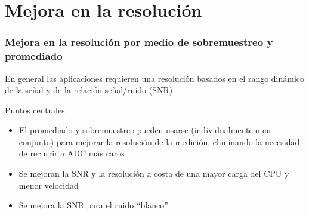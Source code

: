 \documentclass{beamer}
\begin{document}
\section{Mejora en la resolución}

\begin{frame}
\frametitle{Mejora en la resolución por medio de sobremuestreo y promediado}
\begin{exampleblock}{}
En general las aplicaciones requieren una \alert{resolución} basados en el rango
dinámico de la señal y de la relación señal/ruido (SNR) 
\end{exampleblock}
\begin{block}{Puntos centrales}
\begin{itemize}
\item El promediado y sobremuestreo pueden usarse (individualmente o en conjunto) para
mejorar la resolución de la medición, {\color{blue}eliminando la necesidad de recurrir a ADC
más caros}
\item Se mejoran la SNR y la resolución a costa de una mayor carga del CPU y
menor velocidad
\item Se mejora la SNR para el ruido ``blanco''
\end{itemize}
\end{block}
\end{frame}
\end{document}

